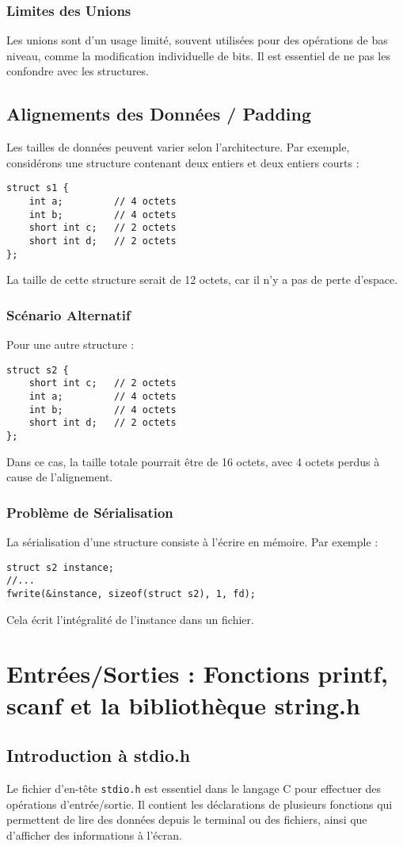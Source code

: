 \documentclass[french,11pt]{article}
\begin{document}
\subsubsection{Limites des Unions}
Les unions sont d'un usage limité, souvent utilisées pour des opérations de bas niveau, comme la modification individuelle de bits. Il est essentiel de ne pas les confondre avec les structures.

\subsection{Alignements des Données / Padding}
Les tailles de données peuvent varier selon l'architecture. Par exemple, considérons une structure contenant deux entiers et deux entiers courts :
\begin{verbatim}
struct s1 {
    int a;         // 4 octets
    int b;         // 4 octets
    short int c;   // 2 octets
    short int d;   // 2 octets
};
\end{verbatim}
La taille de cette structure serait de 12 octets, car il n'y a pas de perte d'espace.

\subsubsection{Scénario Alternatif}
Pour une autre structure :
\begin{verbatim}
struct s2 {
    short int c;   // 2 octets
    int a;         // 4 octets
    int b;         // 4 octets
    short int d;   // 2 octets
};
\end{verbatim}
Dans ce cas, la taille totale pourrait être de 16 octets, avec 4 octets perdus à cause de l'alignement.

\subsubsection{Problème de Sérialisation}
La sérialisation d'une structure consiste à l'écrire en mémoire. Par exemple :
\begin{verbatim}
struct s2 instance;
//...
fwrite(&instance, sizeof(struct s2), 1, fd);
\end{verbatim}
Cela écrit l'intégralité de l'instance dans un fichier.
\section{Entrées/Sorties : Fonctions printf, scanf et la bibliothèque string.h}

\subsection{Introduction à stdio.h}
Le fichier d'en-tête \texttt{stdio.h} est essentiel dans le langage C pour effectuer des opérations d'entrée/sortie. Il contient les déclarations de plusieurs fonctions qui permettent de lire des données depuis le terminal ou des fichiers, ainsi que d'afficher des informations à l'écran.
\end{document}
